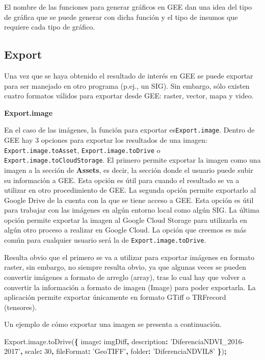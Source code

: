 \documentclass[
]{article}
\newenvironment{Shaded}{\begin{snugshade}}{\end{snugshade}}
\newcommand{\AttributeTok}[1]{\textcolor[rgb]{0.77,0.63,0.00}{#1}}
\newcommand{\DataTypeTok}[1]{\textcolor[rgb]{0.13,0.29,0.53}{#1}}
\newcommand{\DecValTok}[1]{\textcolor[rgb]{0.00,0.00,0.81}{#1}}
\newcommand{\NormalTok}[1]{#1}
\newcommand{\OperatorTok}[1]{\textcolor[rgb]{0.81,0.36,0.00}{\textbf{#1}}}
\newcommand{\StringTok}[1]{\textcolor[rgb]{0.31,0.60,0.02}{#1}}
\newcommand{\VariableTok}[1]{\textcolor[rgb]{0.00,0.00,0.00}{#1}}
\begin{document}
\begin{tipblock}
El nombre de las funciones para generar gráficos en GEE dan una idea del
tipo de gráfica que se puede generar con dicha función y el tipo de
insumos que requiere cada tipo de gráfico.

\end{tipblock}

\hypertarget{export}{%
\subsection{Export}\label{export}}

Una vez que se haya obtenido el resultado de interés en GEE se puede
exportar para ser manejado en otro programa (p.ej., un SIG). Sin
embargo, sólo existen cuatro formatos válidos para exportar desde GEE:
raster, vector, mapa y video.

\textbf{Export.image}

En el caso de las imágenes, la función para exportar
es\texttt{Export.image}. Dentro de GEE hay 3 opciones para exportar los
resultados de una imagen: \texttt{Export.image.toAsset},
\texttt{Export.image.toDrive} o \texttt{Export.image.toCloudStorage}. El
primero permite exportar la imagen como una imagen a la sección de
\textbf{Assets}, es decir, la sección donde el usuario puede subir su
información a GEE. Esta opción es útil para cuando el resultado se va a
utilizar en otro procedimiento de GEE. La segunda opción permite
exportarlo al Google Drive de la cuenta con la que se tiene acceso a
GEE. Esta opción es útil para trabajar con las imágenes en algún entorno
local como algún SIG. La última opción permite exportar la imagen al
Google Cloud Storage para utilizarla en algún otro proceso a realizar en
Google Cloud. La opción que creemos es más común para cualquier usuario
será la de \texttt{Export.image.toDrive}.

Resulta obvio que el primero se va a utilizar para exportar imágenes en
formato raster, sin embargo, no siempre resulta obvio, ya que algunas
veces se pueden convertir imágenes a formato de arreglo (array), tras lo
cual hay que volver a convertir la información a formato de imagen
(Image) para poder exportarla. La aplicación permite exportar únicamente
en formato GTiff o TRFrecord (tensores).

Un ejemplo de cómo exportar una imagen se presenta a continuación.

\begin{Shaded}
\begin{Highlighting}[]
\VariableTok{Export}\NormalTok{.}\VariableTok{image}\NormalTok{.}\AttributeTok{toDrive}\NormalTok{(}\OperatorTok{\{}
  \DataTypeTok{image}\OperatorTok{:}\NormalTok{ imgDiff}\OperatorTok{,}
  \DataTypeTok{description}\OperatorTok{:} \StringTok{'DiferenciaNDVI_2016-2017'}\OperatorTok{,}
  \DataTypeTok{scale}\OperatorTok{:} \DecValTok{30}\OperatorTok{,}
  \DataTypeTok{fileFormat}\OperatorTok{:} \StringTok{'GeoTIFF'}\OperatorTok{,}
  \DataTypeTok{folder}\OperatorTok{:} \StringTok{'DiferenciaNDVIL8'}
\OperatorTok{\}}\NormalTok{)}\OperatorTok{;} 
\end{Highlighting}
\end{Shaded}
\end{document}
